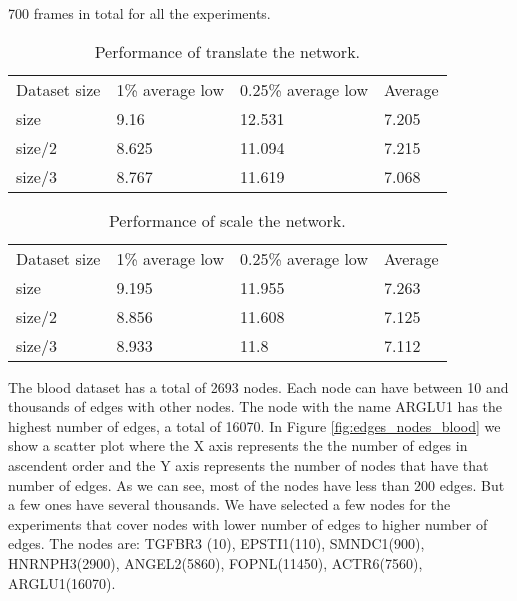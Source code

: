 
700 frames in total for all the experiments.

\begin{table}[h!]
\centering
\begin{tabular}{llll}
Dataset size & 1\% average low & 0.25\% average low & Average \\
size & 9.16 & 12.531 & 7.205 \\
size/2 & 8.625 & 11.094 & 7.215 \\
size/3 & 8.767 & 11.619 & 7.068 \\
\end{tabular}
\caption{Performance of translate the network.}
\label{tab:experiment_moving}
\end{table}

\begin{table}[h!]
\centering
\begin{tabular}{llll}
Dataset size & 1\% average low & 0.25\% average low & Average \\
size & 9.195 & 11.955 & 7.263 \\
size/2 & 8.856 & 11.608 & 7.125 \\
size/3 & 8.933 & 11.8 & 7.112 \\
\end{tabular}
\caption{Performance of scale the network.}
\label{tab:experiment_scale}
\end{table}

The blood dataset has a total of 2693 nodes. Each node can have between 10 and thousands of edges with other nodes. The node with the name ARGLU1 has the highest number of edges, a total of 16070. In Figure \ref{fig:edges_nodes_blood} we show a scatter plot where the X axis represents the the number of edges in ascendent order and the Y axis represents the number of nodes that have that number of edges. As we can see, most of the nodes have less than 200 edges. But a few ones have several thousands. We have selected a few nodes for the experiments that cover nodes with lower number of edges to higher number of edges.
The nodes are: TGFBR3 (10), EPSTI1(110), SMNDC1(900), HNRNPH3(2900), ANGEL2(5860), FOPNL(11450), ACTR6(7560), ARGLU1(16070).

